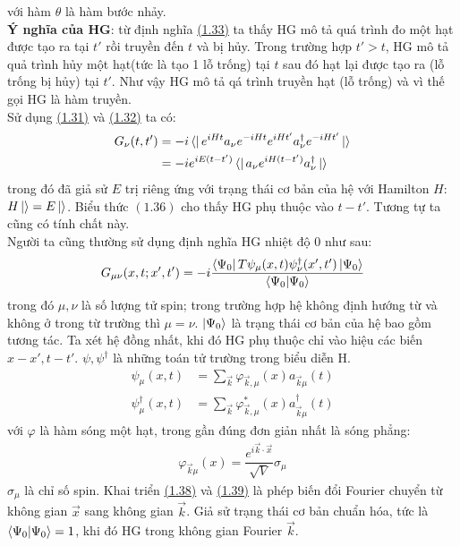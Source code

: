 \documentclass{report}
\begin{document}
với hàm $\theta$ là hàm bước nhảy.\\
\textbf{Ý nghĩa của HG}: từ định nghĩa \hyperref[eq1.33]{(1.33)} ta thấy HG mô tả quá trình đo một hạt được tạo ra tại $t'$ rồi truyền đến $t$ và bị hủy. Trong trường hợp $t'>t$, HG mô tả quả trình hủy một hạt(tức là tạo 1 lỗ trống) tại $t$ sau đó hạt lại được tạo ra (lỗ trống bị hủy) tại $t'$. Như vậy HG mô tả qá trình truyền hạt (lỗ trống) và vì thế gọi HG là hàm truyền.\\
Sử dụng \hyperref[eq1.31]{(1.31)} và \hyperref[eq1.32]{(1.32)} ta có:
\begin{align}
	G_{\nu}(t,t')
	 & = -i \bra{} e^{iHt}a_{\nu}e^{-iHt}e^{iHt'}a^{\dagger}_{\nu}e^{-iHt'}\ket{}\nonumber \\
	 & = -i e^{iE(t-t')}\bra{}a_{\nu}e^{iH(t-t')}a^{\dagger}_{\nu} \ket{}\label{eq1.36}
\end{align}
trong đó đã giả sử $E$ trị riêng ứng với trạng thái cơ bản của hệ với Hamilton $H$: $H\ket{} = E\ket{}$. Biểu thức $\hyperref[eq1.36]{(1.36)}$ cho thấy HG phụ thuộc vào $t-t'$. Tương tự ta cũng có tính chất này.\\
Người ta cũng thường sử dụng định nghĩa HG nhiệt độ 0 như sau:
\begin{align}\label{eq1.37}
	G_{\mu\nu}(x,t;x',t') = -i \dfrac{\bra{\Psi_0}T\psi_{\mu}(x,t)\psi_{\nu}^{\dagger}(x',t')\ket{\Psi_0}}{\bra{\Psi_0}\ket{\Psi_0}}
\end{align}
trong đó $\mu,\nu$ là số lượng tử spin; trong trường hợp hệ không định hướng từ và
không ở trong từ trường thì $\mu=\nu$. $\ket{\Psi_0}$ là trạng thái cơ bản của hệ bao gồm tương tác. Ta xét hệ đồng nhất, khi đó HG phụ thuộc chỉ vào hiệu các biến $x-x',t-t'$. $\psi,\psi^{\dagger}$ là những toán tử trường trong biểu diễn H.
\begin{align}
	\label{eq1.38}
	\psi_{\mu}(x,t)
	 & = \sum_{\vec{k}}\varphi_{\vec{k},\mu}(x)a_{\vec{k}\mu}(t)                  \\
	\label{eq1.39}
	\psi^{\dagger}_{\mu}(x,t)
	 & = \sum_{\vec{k}}\varphi^{\ast}_{\vec{k},\mu}(x)a^{\dagger}_{\vec{k}\mu}(t)
\end{align}
với $\varphi$ là hàm sóng một hạt, trong gần đúng đơn giản nhất là sóng phẳng:
\begin{align}
	\varphi_{\vec{k}\mu}(x) = \dfrac{e^{i\vec{k}\cdot\vec{x}}}{\sqrt{V}}\sigma_{\mu}
\end{align}
$\sigma_{\mu}$ là chỉ số spin. Khai triển \hyperref[eq1.38]{(1.38)} và \hyperref[eq1.39]{(1.39)} là phép biến đổi Fourier chuyển từ không gian $\vec{x}$ sang không gian $\vec{k}$. Giả sử trạng thái cơ bản chuẩn hóa, tức là $\bra{\Psi_0}\ket{\Psi_0} = 1$, khi đó HG trong không gian Fourier $\vec{k}$.
\end{document}
